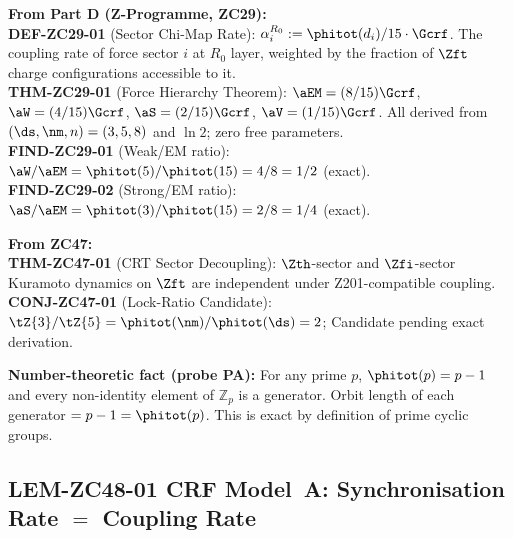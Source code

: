 \documentclass[12pt, a4paper]{article}
\begin{document}
\begin{formalbox}[title={Inherited Objects Used by ZC48}]
\textbf{From Part D (Z-Programme, ZC29):}\\
\textbf{DEF-ZC29-01} (Sector Chi-Map Rate):
$\alpha_i^{R_0} := \phitot(d_i)/15\cdot\Gcrf$.
The coupling rate of force sector $i$ at $R_0$ layer, weighted
by the fraction of $\Zft$ charge configurations accessible to it.\\
\textbf{THM-ZC29-01} (Force Hierarchy Theorem):
$\aEM = (8/15)\Gcrf$,\;
$\aW = (4/15)\Gcrf$,\;
$\aS = (2/15)\Gcrf$,\;
$\aV = (1/15)\Gcrf$.
All derived from $(\ds,\nm,n) = (3,5,8)$ and $\ln 2$;
zero free parameters.\\
\textbf{FIND-ZC29-01} (Weak/EM ratio):
$\aW/\aEM = \phitot(5)/\phitot(15) = 4/8 = 1/2$ (exact).\\
\textbf{FIND-ZC29-02} (Strong/EM ratio):
$\aS/\aEM = \phitot(3)/\phitot(15) = 2/8 = 1/4$ (exact).

\medskip
\textbf{From ZC47:}\\
\textbf{THM-ZC47-01} (CRT Sector Decoupling):
$\Zth$-sector and $\Zfi$-sector Kuramoto dynamics on $\Zft$
are independent under Z201-compatible coupling.\\
\textbf{CONJ-ZC47-01} (Lock-Ratio Candidate):
$\tZ{3}/\tZ{5} = \phitot(\nm)/\phitot(\ds) = 2$;
Candidate pending exact derivation.

\medskip
\textbf{Number-theoretic fact (probe PA):}
For any prime $p$, $\phitot(p) = p-1$ and every non-identity
element of $\mathbb{Z}_p$ is a generator.
Orbit length of each generator $= p-1 = \phitot(p)$.
This is exact by definition of prime cyclic groups.
\end{formalbox}

\subsection{LEM-ZC48-01 \quad CRF Model~A: Synchronisation Rate
  $= $ Coupling Rate}
\label{sec:lem01}

\end{document}
